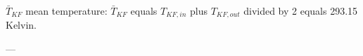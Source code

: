 \( \bar{T}_{KF} \) mean temperature:  
\( \bar{T}_{KF} \) equals \( T_{KF,in} \) plus \( T_{KF,out} \) divided by 2 equals 293.15 Kelvin.  

---